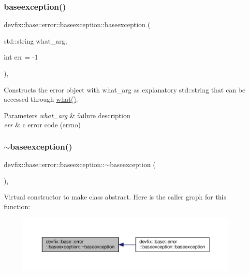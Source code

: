 \subsubsection{\texorpdfstring{baseexception()}{baseexception()}\hspace{0.1cm}{\footnotesize\ttfamily [2/2]}}
{\footnotesize\ttfamily devfix\+::base\+::error\+::baseexception\+::baseexception (\begin{DoxyParamCaption}\item[{std\+::string}]{what\+\_\+arg,  }\item[{int}]{err = {\ttfamily -\/1} }\end{DoxyParamCaption})\hspace{0.3cm}{\ttfamily [inline]}, {\ttfamily [explicit]}}

Constructs the error object with what\+\_\+arg as explanatory std\+::string that can be accessed through \hyperlink{structdevfix_1_1base_1_1error_1_1baseexception_a16327152a55d65b1e537825231fbd452}{what()}. 
\begin{DoxyParams}{Parameters}
{\em what\+\_\+arg} & failure description \\
\hline
{\em err} & c error code (errno) \\
\hline
\end{DoxyParams}
\mbox{\label{structdevfix_1_1base_1_1error_1_1baseexception_a3ae67c736d3268683cb92556c9f14bd7}} 
\subsubsection{\texorpdfstring{$\sim$baseexception()}{~baseexception()}}
{\footnotesize\ttfamily devfix\+::base\+::error\+::baseexception\+::$\sim$baseexception (\begin{DoxyParamCaption}{ }\end{DoxyParamCaption})\hspace{0.3cm}{\ttfamily [override]}, {\ttfamily [default]}}

Virtual constructor to make class abstract. Here is the caller graph for this function\+:\nopagebreak
\begin{figure}[H]
\begin{center}
\leavevmode
\includegraphics[width=350pt]{structdevfix_1_1base_1_1error_1_1baseexception_a3ae67c736d3268683cb92556c9f14bd7_icgraph}
\end{center}
\end{figure}


